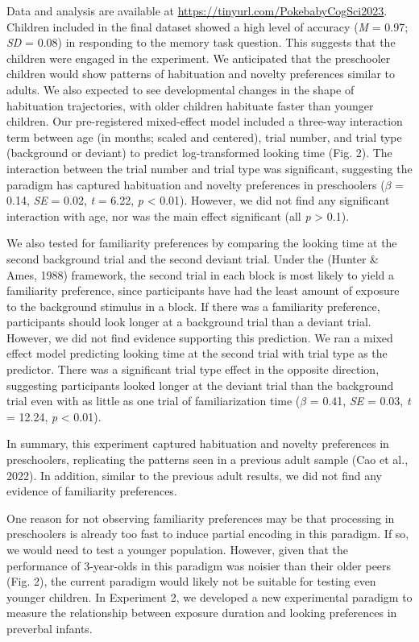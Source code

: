 \documentclass[10pt, letterpaper]{article}
\begin{document}
Data and analysis are available at
\url{https://tinyurl.com/PokebabyCogSci2023}. Children included in the
final dataset showed a high level of accuracy (\emph{M} = 0.97;
\emph{SD} = 0.08) in responding to the memory task question. This
suggests that the children were engaged in the experiment. We
anticipated that the preschooler children would show patterns of
habituation and novelty preferences similar to adults. We also expected
to see developmental changes in the shape of habituation trajectories,
with older children habituate faster than younger children. Our
pre-registered mixed-effect model included a three-way interaction term
between age (in months; scaled and centered), trial number, and trial
type (background or deviant) to predict log-transformed looking time
(Fig. 2). The interaction between the trial number and trial type was
significant, suggesting the paradigm has captured habituation and
novelty preferences in preschoolers (\(\beta\) = 0.14, \emph{SE} = 0.02,
\emph{t} = 6.22, \emph{p} \textless{} 0.01). However, we did not find
any significant interaction with age, nor was the main effect
significant (all \emph{p} \textgreater{} 0.1).

We also tested for familiarity preferences by comparing the looking time
at the second background trial and the second deviant trial. Under the
(Hunter \& Ames, 1988) framework, the second trial in each block is most
likely to yield a familiarity preference, since participants have had
the least amount of exposure to the background stimulus in a block. If
there was a familiarity preference, participants should look longer at a
background trial than a deviant trial. However, we did not find evidence
supporting this prediction. We ran a mixed effect model predicting
looking time at the second trial with trial type as the predictor. There
was a significant trial type effect in the opposite direction,
suggesting participants looked longer at the deviant trial than the
background trial even with as little as one trial of familiarization
time (\(\beta\) = 0.41, \emph{SE} = 0.03, \emph{t} = 12.24, \emph{p}
\textless{} 0.01).

In summary, this experiment captured habituation and novelty preferences
in preschoolers, replicating the patterns seen in a previous adult
sample (Cao et al., 2022). In addition, similar to the previous adult
results, we did not find any evidence of familiarity preferences.

One reason for not observing familiarity preferences may be that
processing in preschoolers is already too fast to induce partial
encoding in this paradigm. If so, we would need to test a younger
population. However, given that the performance of 3-year-olds in this
paradigm was noisier than their older peers (Fig. 2), the current
paradigm would likely not be suitable for testing even younger children.
In Experiment 2, we developed a new experimental paradigm to measure the
relationship between exposure duration and looking preferences in
preverbal infants.
\end{document}
